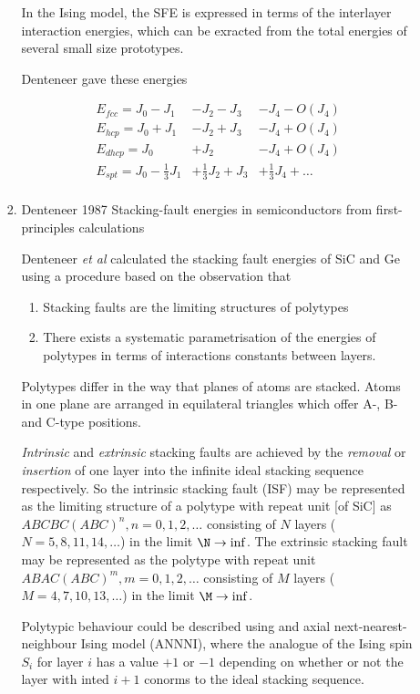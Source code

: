 \documentclass[11pt]{article}
\begin{document}
\begin{enumerate}
\begin{enumerate}
\begin{enumerate}
In the Ising model, the SFE is expressed in terms of the interlayer
interaction energies, which can be exracted from the total energies of several
small size prototypes. 
\cite{Denteneer1987}

Denteneer gave these energies 
\begin{LaTeX}
\begin{align}
E_{fcc} = J_0 - J_1 &- J_2 - J_3 &- J_4 - O(J_4) \\
E_{hcp} = J_0 + J_1 &- J_2 + J_3 &- J_4 + O(J_4) \\
E_{dhcp}= J_0       &+ J_2       &- J_4 + O(J_4) \\
E_{spt} = J_0 - \frac{1}{3}J_1 &+ \frac{1}{3}J_2 + J_3 &+ \frac{1}{3}J_4 + \ldots \\
\end{align}
\end{LaTeX}

\item Denteneer 1987 Stacking-fault energies in semiconductors from first-principles calculations
\label{sec:org525b575}
\cite{Denteneer1987}

Denteneer \emph{et al} calculated the stacking fault energies of SiC and Ge using a procedure
based on the observation that 
\begin{enumerate}
\item Stacking faults are the limiting structures of polytypes
\item There exists a systematic parametrisation of the energies of polytypes in
terms of interactions constants between layers.
\end{enumerate}

Polytypes differ in the way that planes of atoms are stacked. Atoms in one
plane are arranged in equilateral triangles which offer A-, B- and C-type
positions. 

\emph{Intrinsic} and \emph{extrinsic} stacking faults are achieved by the \emph{removal} or
\emph{insertion} of one layer into the infinite ideal stacking sequence
respectively. 
So the intrinsic stacking fault (ISF) may be represented as the limiting
structure of a polytype with repeat unit [of SiC] as \(ABCBC(ABC)^n,
n=0,1,2,\ldots\) consisting of \(N\) layers (\(N=5,8,11,14,\ldots\)) in the limit
\(\N \rightarrow \inf\). 
The extrinsic stacking fault may be represented as the polytype with repeat
unit  \(ABAC(ABC)^m, m=0,1,2,\ldots\) consisting of \(M\) layers
(\(M=4,7,10,13,\ldots\)) in the limit \(\M \rightarrow \inf\). 

Polytypic behaviour could be described using and axial next-nearest-neighbour
Ising model (ANNNI), where the analogue of the Ising spin \(S_i\) for layer \(i\)
has a value \(+1\) or \(-1\) depending on whether or not the layer with inted
\(i+1\) conorms to the ideal stacking sequence. 


\end{enumerate}
\end{enumerate}
\end{enumerate}
\end{document}
